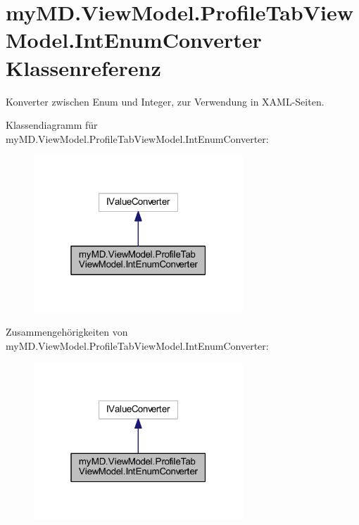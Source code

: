 \hypertarget{classmy_m_d_1_1_view_model_1_1_profile_tab_view_model_1_1_int_enum_converter}{}\section{my\+M\+D.\+View\+Model.\+Profile\+Tab\+View\+Model.\+Int\+Enum\+Converter Klassenreferenz}
\label{classmy_m_d_1_1_view_model_1_1_profile_tab_view_model_1_1_int_enum_converter}


Konverter zwischen Enum und Integer, zur Verwendung in X\+A\+M\+L-\/\+Seiten.  




Klassendiagramm für my\+M\+D.\+View\+Model.\+Profile\+Tab\+View\+Model.\+Int\+Enum\+Converter\+:\nopagebreak
\begin{figure}[H]
\begin{center}
\leavevmode
\includegraphics[width=223pt]{classmy_m_d_1_1_view_model_1_1_profile_tab_view_model_1_1_int_enum_converter__inherit__graph}
\end{center}
\end{figure}


Zusammengehörigkeiten von my\+M\+D.\+View\+Model.\+Profile\+Tab\+View\+Model.\+Int\+Enum\+Converter\+:\nopagebreak
\begin{figure}[H]
\begin{center}
\leavevmode
\includegraphics[width=223pt]{classmy_m_d_1_1_view_model_1_1_profile_tab_view_model_1_1_int_enum_converter__coll__graph}
\end{center}
\end{figure}

